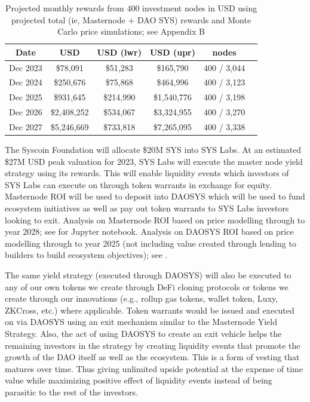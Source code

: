 \documentclass[journal,twocolumn,12pt]{ieeesyscoin}
\begin{document}
\begin{table}[h]
\centering
\begin{tabular}{ |c|c|c|c|c|c| } 
\hline
 \textbf{Date} & \textbf{USD} & \textbf{USD (lwr)} & \textbf{USD (upr)} & \textbf{nodes} \\
\hline
Dec 2023 & \$78,091 & \$51,283 & \$165,790 & 400 / 3,044\\
Dec 2024 & \$250,676 & \$75,868 & \$464,996  & 400 / 3,123 \\
Dec 2025 & \$931,645 & \$214,990 & \$1,540,776 & 400 / 3,198 \\
Dec 2026 & \$2,408,252 & \$534,067 & \$3,324,955 & 400 / 3,270 \\
Dec 2027 & \$5,246,669 & \$733,818 & \$7,265,095 & 400 / 3,338 \\
\hline
\end{tabular}
\caption{Projected monthly rewards from 400 investment nodes in USD using projected total (ie, Masternode + DAO SYS) rewards and Monte Carlo price simulations; see Appendix B}
\label{table:mn_returns}
\end{table}

The Syscoin Foundation will allocate \$20M SYS into SYS Labs. At an estimated \$27M USD peak valuation for 2023, SYS Labs will execute the master node yield strategy using its rewards. This will enable liquidity events which investors of SYS Labs can execute on through token warrants in exchange for equity. Masternode ROI will be used to deposit into DAOSYS which will be used to fund ecosystem initiatives as well as pay out token warrants to SYS Labs investors looking to exit. Analysis on Masternode ROI based on price modelling through to year 2028; see \cite{DAOSim22} for Jupyter notebook. Analysis on DAOSYS ROI based on price modelling through to year 2025 (not including value created through lending to builders to build ecosystem objectives); see \cite{DAOSim22}.

The same yield strategy (executed through DAOSYS) will also be executed to any of our own tokens we create through DeFi cloning protocols or tokens we create through our innovations (e.g., rollup gas tokens, wallet token, Luxy, ZKCross, etc.) where applicable. Token warrants would be issued and executed on via DAOSYS using an exit mechanism similar to the Masternode Yield Strategy. Also, the act of using DAOSYS to create an exit vehicle helps the remaining investors in the strategy by creating liquidity events that promote the growth of the DAO itself as well as the ecosystem. This is a form of vesting that matures over time. Thus giving unlimited upside potential at the expense of time value while maximizing positive effect of liquidity events instead of being parasitic to the rest of the investors.
\end{document}
